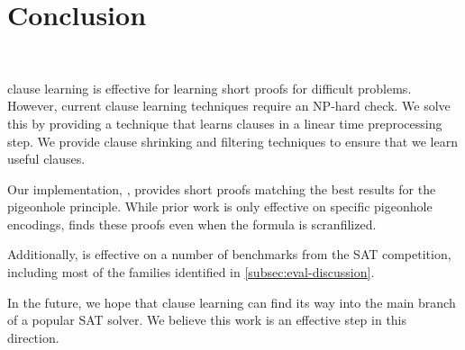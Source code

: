\section{Conclusion}~\label{sec:conclusion}


\pr clause learning is effective for learning short proofs for 
difficult problems. However, current \pr clause learning techniques require
an NP-hard check. We solve this by providing a technique that learns \pr clauses
in a linear time preprocessing step. We provide clause shrinking and filtering 
techniques to ensure that we learn useful \pr clauses.

Our implementation, \tool, provides short \pr proofs matching the best results for 
the pigeonhole principle. While prior work is only effective on specific pigeonhole
encodings, \tool finds these proofs even when the formula is scranfilized.

Additionally, \tool is effective on a number of benchmarks from the SAT competition,
including most of the families identified in \autoref{subsec:eval-discussion}.

In the future, we hope that \pr clause learning can find its way into the main branch
of a popular SAT solver. We believe this work is an effective step in this direction.

